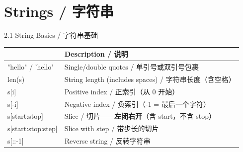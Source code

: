 \documentclass[11pt,a4paper]{report}
\begin{document}
\newpage

\chapter{Strings / 字符串}

\begin{cmdsection}{2.1  String Basics / 字符串基础}
\normalsize\renewcommand{\arraystretch}{1.4}
\centering
\begin{tabularx}{\textwidth}{@{}>{\ttfamily}l>{\raggedright\arraybackslash}X@{}}
\toprule
\multicolumn{1}{@{}l}{\textbf{Syntax}} & \textbf{Description / 说明} \\ \midrule
"hello" / 'hello'       & Single/double quotes / 单引号或双引号包裹 \\
len(s)                  & String length (includes spaces) / 字符串长度（含空格） \\
s[i]                    & Positive index / 正索引（从 0 开始） \\
s[-i]                   & Negative index / 负索引（-1 = 最后一个字符） \\
s[start:stop]           & Slice / 切片——\textbf{左闭右开}（含 start，不含 stop） \\
s[start:stop:step]      & Slice with step / 带步长的切片 \\
s[::-1]                 & Reverse string / 反转字符串 \\
\bottomrule
\end{tabularx}
\end{cmdsection}
\end{document}
